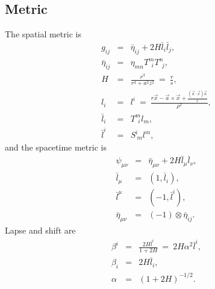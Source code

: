 \documentclass{article}
\begin{document}
\subsection{Metric}
The spatial metric is
\begin{eqnarray}
	g_{ij} &=& \bar{\eta}_{ij} +2H\bar{l}_i\bar{l}_j, \\
	\bar{\eta}_{ij} &=& \eta_{mn} T^m_{\ \ i} T^n_{\ \ j}, \\
	H &=& \frac{r^3}{r^4 + a^2z^2} \ =\ \frac{r}{s}, \\
	l_i &=&  l^i \ =\  \frac{r\vec{x}-\vec{a}\times\vec{x}+\displaystyle\frac{(\vec{a}\cdot\vec{x})\vec{a}}{r}}{\rho^2}, \\
	\bar{l}_i &=& T^m_{\ \ i} l_m, \\
	\bar{l}^i &=& S^i_{\ m} l^m, 
\end{eqnarray}
and the spacetime metric is
\begin{eqnarray}
	\psi_{\mu\nu} &=& \bar{\eta}_{\mu\nu} + 2 H \bar{l}_\mu \bar{l}_\nu, \\
	\bar{l}_{\mu} &=& (1, \bar{l}_i), \\
	\bar{l}^{\mu} &=& (-1, \bar{l}^i), \\
	\bar{\eta}_{\mu\nu} &=& (-1)\otimes \bar{\eta}_{ij}. 
\end{eqnarray}
Lapse and shift are
\begin{eqnarray}
	\beta^i &=& \frac{2 H \bar{l}^i}{1+2H}\ = \ 2 H \alpha^2 \bar{l}^i,\\
	\beta_i &=& 2 H \bar{l}_i, \\
	\alpha &=& (1+2 H)^{-1/2}.
\end{eqnarray}
\end{document}

